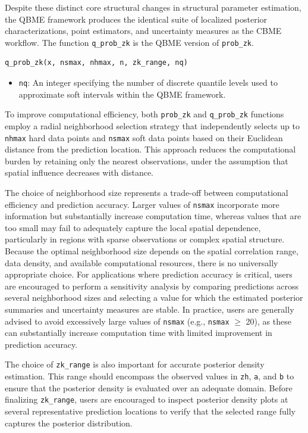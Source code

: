 Despite these distinct core structural changes in structural parameter estimation, the QBME framework produces the identical suite of localized posterior characterizations, point estimators, and uncertainty measures as the CBME workflow. The function \texttt{q\_prob\_zk} is the QBME version of \texttt{prob\_zk}.

\begin{verbatim}
q_prob_zk(x, nsmax, nhmax, n, zk_range, nq)
\end{verbatim}

\begin{itemize}
\tightlist
\item
  \texttt{nq}: An integer specifying the number of discrete quantile levels used to approximate soft intervals within the QBME framework.
\end{itemize}

To improve computational efficiency, both \texttt{prob\_zk} and \texttt{q\_prob\_zk} functions employ a radial neighborhood selection strategy that independently selects up to \texttt{nhmax} hard data points and \texttt{nsmax} soft data points based on their Euclidean distance from the prediction location. This approach reduces the computational burden by retaining only the nearest observations, under the assumption that spatial influence decreases with distance.

The choice of neighborhood size represents a trade-off between computational efficiency and prediction accuracy. Larger values of \texttt{nsmax} incorporate more information but substantially increase computation time, whereas values that are too small may fail to adequately capture the local spatial dependence, particularly in regions with sparse observations or complex spatial structure. Because the optimal neighborhood size depends on the spatial correlation range, data density, and available computational resources, there is no universally appropriate choice. For applications where prediction accuracy is critical, users are encouraged to perform a sensitivity analysis by comparing predictions across several neighborhood sizes and selecting a value for which the estimated posterior summaries and uncertainty measures are stable. In practice, users are generally advised to avoid excessively large values of \texttt{nsmax} (e.g., \texttt{nsmax} \(\geq\) 20), as these can substantially increase computation time with limited improvement in prediction accuracy.

The choice of \texttt{zk\_range} is also important for accurate posterior density estimation. This range should encompass the observed values in \texttt{zh}, \texttt{a}, and \texttt{b} to ensure that the posterior density is evaluated over an adequate domain. Before finalizing \texttt{zk\_range}, users are encouraged to inspect posterior density plots at several representative prediction locations to verify that the selected range fully captures the posterior distribution.


